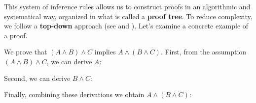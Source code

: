 This system of inference rules allows us to construct proofs in an 
algorithmic and systematical way, organized in what is called a \textbf{proof tree}. 
To reduce complexity, we follow a 
\textbf{top-down} approach (see \cite{thompson1999types} and 
\cite{nordstrom1990programming}).
Let's examine a concrete example of a proof.
\begin{example}
We prove that $(A \land B) \land C$ implies $A \land (B \land C)$.
First, from the assumption $(A \land B) \land C$, we can derive $A$:
\begin{prooftree}
\end{prooftree}
Second, we can derive $B \land C$:
\begin{prooftree}
\end{prooftree}
Finally, combining these derivations we obtain $A \land (B \land C)$:
\begin{prooftree}
\end{prooftree}
\end{example}

